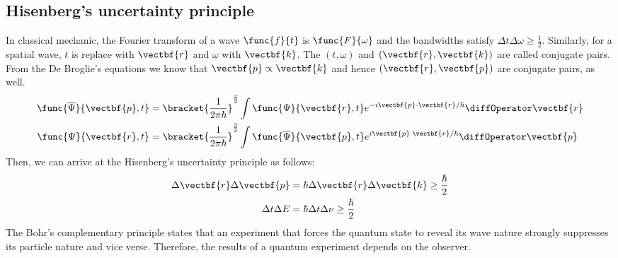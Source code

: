 \subsection*{Hisenberg's uncertainty principle}
In classical mechanic, the Fourier transform of a wave \(\func{f}{t}\) is \(\func{F}{\omega}\) and the bandwidths satisfy \(\Delta t \Delta \omega \geq \frac{1}{2}\). Similarly, for a spatial wave, \(t\) is replace with \(\vectbf{r}\) and \(\omega\) with \(\vectbf{k}\). The \((t,\omega)\) and \((\vectbf{r}, \vectbf{k})\) are called conjugate pairs. From the De Broglie's equations we know that \(\vectbf{p} \propto \vectbf{k}\) and hence \((\vectbf{r}, \vectbf{p})\) are conjugate pairs, as well.
\begin{align*}
    \func{\overline{\Psi}}{\vectbf{p},t} & = \bracket{\dfrac{1}{2\pi \hbar}}^{\frac{3}{2}} \int \func{\Psi}{\vectbf{r},t} e^{-i \vectbf{p} \cdot \vectbf{r}/\hbar}\diffOperator \vectbf{r}           \\
    \func{\Psi}{\vectbf{r},t}            & = \bracket{\dfrac{1}{2\pi \hbar}}^{\frac{3}{2}} \int \func{\overline{\Psi}}{\vectbf{p},t} e^{i \vectbf{p} \cdot \vectbf{r}/\hbar}\diffOperator \vectbf{p}
\end{align*}
Then, we can arrive at the Hisenberg's uncertainty principle as follows:
\begin{align*}
    \Delta \vectbf{r} \Delta \vectbf{p} & = \hbar\Delta \vectbf{r} \Delta  \vectbf{k} \geq \dfrac{\hbar}{2} \\
    \Delta t \Delta E                   & = \hbar \Delta t \Delta  \nu \geq \dfrac{\hbar}{2}
\end{align*}
The Bohr's complementary principle states that an experiment that forces the quantum state to reveal its wave nature strongly suppresses its particle nature and vice verse. Therefore, the results of a quantum experiment depends on the observer.


